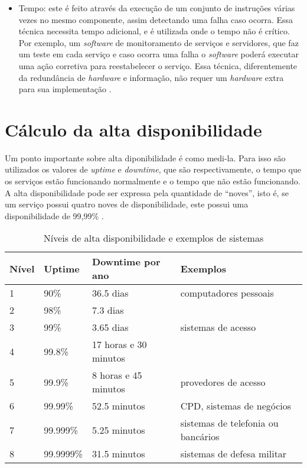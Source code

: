 \begin{itemize}
 \item Tempo: este é feito através da execução de um conjunto de instruções várias vezes no mesmo componente, assim detectando uma falha caso 
 ocorra. Essa técnica necessita tempo adicional, e é utilizada onde o tempo não é crítico. Por exemplo, um \textit{software} de monitoramento 
 de serviços e servidores, que faz um teste em cada serviço e caso ocorra uma falha o \textit{software} poderá executar uma ação corretiva para 
 reestabelecer o serviço. Essa técnica, diferentemente da redundância de \textit{hardware} e informação, não requer um \textit{hardware} 
 extra para sua implementação \cite{costa2009}.
\end{itemize}

\section{Cálculo da alta disponibilidade}

Um ponto importante sobre alta diponibilidade é como medi-la. Para isso são utilizados os valores de \textit{uptime} e \textit{downtime}, 
que são respectivamente, o tempo que os serviços estão funcionando normalmente e o tempo que não estão funcionando. A alta disponibilidade 
pode ser expressa pela quantidade de ``noves'', isto é, se um serviço possui quatro noves de disponibilidade, este possui uma 
disponibilidade de 99,99\% \cite{pereirafilho2004}.

\begin{table}
\caption {Níveis de alta disponibilidade e exemplos de sistemas}
\label{tab:dispniveis}
\begin{center}
\begin{tabular}{|l|l|l|l|}\hline
Nível & Uptime & Downtime por ano & Exemplos\\\hline
1 & 90\% & 36.5 dias & computadores pessoais\\\hline
2 & 98\% & 7.3 dias & \\\hline
3 & 99\% & 3.65 dias & sistemas de acesso\\\hline
4 & 99.8\% & 17 horas e 30 minutos & \\\hline
5 & 99.9\% & 8 horas e 45 minutos & provedores de acesso\\\hline
6 & 99.99\% & 52.5 minutos & CPD, sistemas de negócios\\\hline
7 & 99.999\% & 5.25 minutos & sistemas de telefonia ou bancários\\\hline
8 & 99.9999\% & 31.5 minutos & sistemas de defesa militar\\\hline
\end{tabular}
\end{center}
\end{table}

